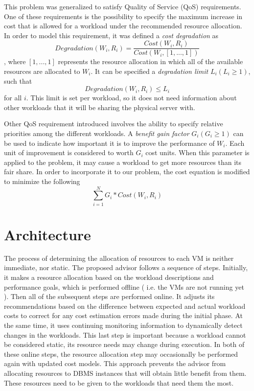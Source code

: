 This problem was generalized to satisfy Quality of Service (QoS) requirements. One of these requirements is the possibility to specify the maximum increase in cost that is allowed for a workload under the recommended resource allocation. In order to model this requirement, it was defined a \textit{cost degradation} as
\[
 Degradation(W_{i},R_{i}) = \frac{Cost(W_{i},R_{i})}{Cost(W_{i},[1,...,1])}
\]
, where $[1,...,1]$ represents the resource allocation in which all of the available resources are allocated to $W_{i}$. It can be specified a \textit{degradation limit} $L_{i} ( L_{i} \geq 1 )$, such that 
\[
 Degradation(W_{i}, R_{i}) \leq L_{i}
\]
for all $i$. This limit is set per workload, so it does not need information about other workloads that it will be sharing the physical server with.

Other QoS requirement introduced involves the ability to specify relative priorities among the different workloads. A \textit{benefit gain factor} $G_{i} (G_{i} \geq 1)$ can be used to indicate how important it is to improve the performance of $W_{i}$. Each unit of improvement is considered to worth $G_{i}$ cost units. When this parameter is applied to the problem, it may cause a workload to get more resources than its fair share. In order to incorporate it to our problem, the cost equation is modified to minimize the following
\[
  \sum_{i=1}^{N} G_{i} * Cost(W_{i},R_{i})
\]


\section{Architecture}

The process of  determining the allocation of resources to each VM is neither immediate, nor static. The proposed advisor follows a sequence of steps. Initially, it makes a resource allocation based on the workload descriptions and performance goals, which is performed offline ( i.e. the VMs are not running yet ). Then all of the subsequent steps are performed online. It adjusts its recommendations based on the difference between expected and actual workload costs to correct for any cost estimation errors made during the initial phase. At the same time, it uses continuing monitoring information to dynamically detect changes in the workloads. This last step is important because a workload cannot be considered static, its resource needs may change during execution. In both of these online steps, the resource allocation step may occasionally be performed again with updated cost models. This approach prevents the advisor from allocating resources to DBMS instances that will obtain little benefit from them. These 
resources need to be given to the workloads that need them the most.

